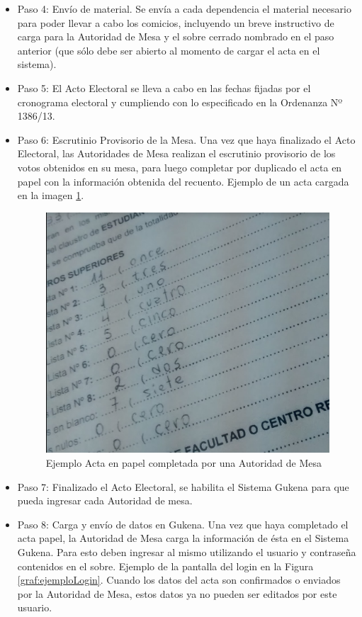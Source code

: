 \begin{itemize}
\item Paso 4: Envío de material. Se envía a cada dependencia el material necesario para poder llevar a cabo los comicios, incluyendo un breve instructivo de carga para la Autoridad de Mesa y el sobre cerrado nombrado en el paso anterior (que sólo debe ser abierto al momento de cargar el acta en el sistema).
\item Paso 5: El Acto Electoral se lleva a cabo en las fechas fijadas por el cronograma electoral y cumpliendo con lo especificado en la Ordenanza Nº 1386/13.
\item Paso 6: Escrutinio Provisorio de la Mesa. 
Una vez que haya finalizado el Acto Electoral, las Autoridades de Mesa realizan el escrutinio provisorio de los votos obtenidos en su mesa, para luego completar por duplicado el acta en papel con la información obtenida del recuento. Ejemplo de un acta cargada en la imagen \ref{graf:ejemploActa}.

\begin{figure}[h!]
    \begin{center}
        \includegraphics[scale=0.25]{img/f4P4qmrKXY.png}
    \end{center}
  \caption{Ejemplo Acta en papel completada por una Autoridad de Mesa}
  \label{graf:ejemploActa}
\end{figure}

\item Paso 7: Finalizado el Acto Electoral, se habilita el Sistema Gukena para que pueda ingresar cada Autoridad de mesa.
\item Paso 8: Carga y envío de datos en Gukena. Una vez que haya completado el acta papel, la Autoridad de Mesa carga la información de ésta en el Sistema Gukena. Para esto deben ingresar al mismo utilizando el usuario y contraseña contenidos en el sobre. Ejemplo de la pantalla del login en la Figura \ref{graf:ejemploLogin}.
Cuando los datos del acta son confirmados o enviados por la Autoridad de Mesa, estos datos ya no pueden ser editados por este usuario.


\end{itemize}
